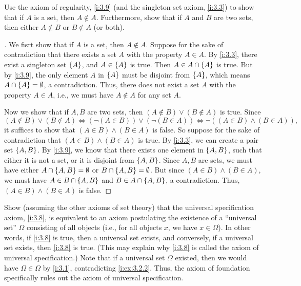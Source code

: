 \begin{ex}\label{i:ex:3.2.2}
  Use the axiom of regularity, \cref{i:3.9} (and the singleton set axiom, \cref{i:3.3}) to show that if \(A\) is a set, then \(A \notin A\).
  Furthermore, show that if \(A\) and \(B\) are two sets, then either \(A \notin B\) or \(B \notin A\) (or both).
\end{ex}

\begin{proof}[]
  We fisrt show that if \(A\) is a set, then \(A \notin A\).
  Suppose for the sake of contradiction that there exists a set \(A\) with the property \(A \in A\).
  By \cref{i:3.3}, there exist a singleton set \(\left\lbrace A\right\rbrace\), and \(A \in \left\lbrace A\right\rbrace\) is true.
  Then \(A \in A \cap \left\lbrace A\right\rbrace\) is true.
  But by \cref{i:3.9}, the only element \(A\) in \(\left\lbrace A\right\rbrace\) must be disjoint from \(\left\lbrace A\right\rbrace\), which means \(A \cap \left\lbrace A\right\rbrace = \emptyset\), a contradiction.
  Thus, there does not exist a set \(A\) with the property \(A \in A\), i.e., we must have \(A \notin A\) for any set \(A\).

  Now we show that if \(A, B\) are two sets, then \((A \notin B) \lor (B \notin A)\) is true.
  Since
  \[
    (A \notin B) \lor (B \notin A) \iff (\lnot(A \in B)) \lor (\lnot(B \in A)) \iff \lnot ((A \in B) \land (B \in A)),
  \]
  it suffices to show that \((A \in B) \land (B \in A)\) is false.
  So suppose for the sake of contradiction that \((A \in B) \land (B \in A)\) is true.
  By \cref{i:3.3}, we can create a pair set \(\left\lbrace A, B\right\rbrace\).
  By \cref{i:3.9}, we know that there exists one element in \(\left\lbrace A, B\right\rbrace\), such that either it is not a set, or it is disjoint from \(\left\lbrace A, B\right\rbrace\).
  Since \(A, B\) are sets, we must have either \(A \cap \left\lbrace A, B\right\rbrace = \emptyset\) or \(B \cap \left\lbrace A, B\right\rbrace = \emptyset\).
  But since \((A \in B) \land (B \in A)\), we must have \(A \in B \cap \left\lbrace A, B\right\rbrace\) and \(B \in A \cap \left\lbrace A, B\right\rbrace\), a contradiction.
  Thus, \((A \in B) \land (B \in A)\) is false.
\end{proof}

\begin{ex}\label{i:ex:3.2.3}
  Show (assuming the other axioms of set theory) that the universal specification axiom, \cref{i:3.8}, is equivalent to an axiom postulating the existence of a ``universal set'' \(\Omega\) consisting of all objects (i.e., for all objects \(x\), we have \(x \in \Omega\)).
  In other words, if \cref{i:3.8} is true, then a universal set exists, and conversely, if a universal set exists, then \cref{i:3.8} is true.
  (This may explain why \cref{i:3.8} is called the axiom of universal specification.)
  Note that if a universal set \(\Omega\) existed, then we would have \(\Omega \in \Omega\) by \cref{i:3.1}, contradicting \cref{i:ex:3.2.2}.
  Thus, the axiom of foundation specifically rules out the axiom of universal specification.
\end{ex}

